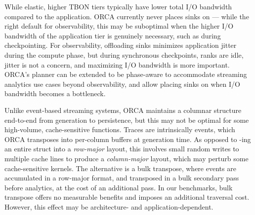 While elastic, higher TBON tiers typically have lower total I/O bandwidth compared to
the application.
ORCA currently never places sinks on \tiermpi{} ---
while the right default for observability, this may be suboptimal when the higher I/O bandwidth
of the application tier is genuinely necessary, such as during checkpointing.
For observability, offloading sinks minimizes application jitter during the compute phase,
but during synchronous checkpoints, ranks are idle, jitter is not a concern, and maximizing
I/O bandwidth is more important.
ORCA's planner can be extended to be phase-aware to
accommodate streaming analytics use cases beyond observability, and allow placing sinks on
\tiermpi{} when I/O bandwidth becomes a
bottleneck.




Unlike event-based streaming systems, ORCA maintains a columnar structure end-to-end from
generation
to persistence, but this may not be optimal for some high-volume, cache-sensitive functions.
Traces are intrinsically events, which ORCA transposes into
per-column buffers at generation time.
As opposed to \memcpy{}-ing an entire struct
into a \emph{row-major} layout,
this involves small random writes to multiple cache lines to produce a \emph{column-major} layout,
which may perturb some cache-sensitive kernels.
The alternative is a bulk transpose, where events are accumulated in a row-major format,
and transposed in a bulk secondary pass before analytics, at the cost of an additional pass.
In our benchmarks, bulk
transpose offers no measurable benefits and imposes an additional
traversal cost.
However, this effect may be architecture- and
application-dependent.
